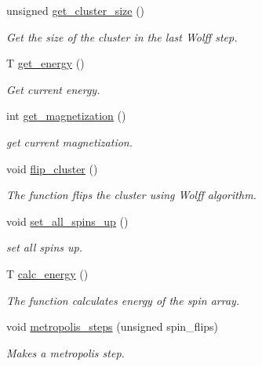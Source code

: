 \begin{DoxyCompactItemize}
unsigned \mbox{\hyperlink{classIsingModel_afd731e5858b03deb1c8a11ee8a6b8834}{get\+\_\+cluster\+\_\+size}} ()
\begin{DoxyCompactList}\small\item\em Get the size of the cluster in the last Wolff step. \end{DoxyCompactList}\item 
T \mbox{\hyperlink{classIsingModel_a37a7c509999f21f1bd4f54a12009f3cf}{get\+\_\+energy}} ()
\begin{DoxyCompactList}\small\item\em Get current energy. \end{DoxyCompactList}\item 
int \mbox{\hyperlink{classIsingModel_a58c9ebc61c0b2238fd52b62df8ce4853}{get\+\_\+magnetization}} ()
\begin{DoxyCompactList}\small\item\em get current magnetization. \end{DoxyCompactList}\item 
void \mbox{\hyperlink{classIsingModel_ab76a4eee808eaa1979ff6707498e9908}{flip\+\_\+cluster}} ()
\begin{DoxyCompactList}\small\item\em The function flips the cluster using Wolff algorithm. \end{DoxyCompactList}\item 
void \mbox{\hyperlink{classIsingModel_ac16bfdd5bb4012162bedd90034962f58}{set\+\_\+all\+\_\+spins\+\_\+up}} ()
\begin{DoxyCompactList}\small\item\em set all spins up. \end{DoxyCompactList}\item 
T \mbox{\hyperlink{classIsingModel_a0a387ccae720604f4de13d5b0762ac62}{calc\+\_\+energy}} ()
\begin{DoxyCompactList}\small\item\em The function calculates energy of the spin array. \end{DoxyCompactList}\item 
void \mbox{\hyperlink{classIsingModel_a195316f577d71297e9634fa6fdeacc44}{metropolis\+\_\+steps}} (unsigned spin\+\_\+flips)
\begin{DoxyCompactList}\small\item\em Makes a metropolis step. \end{DoxyCompactList}\end{DoxyCompactItemize}
